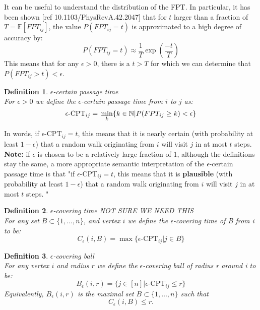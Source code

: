 \documentclass{article}
\newtheorem{definition}{Definition}
\begin{document}
It can be useful to understand the distribution of the FPT. In particular, it has been shown [ref 
10.1103/PhysRevA.42.2047] that for $t$ larger than a fraction of $T=\mathbb{E}[FPT_{ij}]$, the value $P(FPT_{ij}=t)$ is approximated to a high degree of accuracy by:
\begin{equation}
P(FPT_{ij}=t) \approx \frac{1}{T}\exp\left({\frac{-t}{T}}\right)
\end{equation}
This means that for any $\epsilon>0$, there is a $t>T$ for which we can determine that $P(FPT_{ij}>t)<\epsilon$.
\begin{definition}
    $\epsilon$-certain passage time \\
    For $\epsilon > 0$ we define the $\epsilon$-certain passage time from $i$ to $j$ as:
     \[
         \epsilon\text{-CPT}_{ij} =   \\\min_k \{k \in \mathbb{N} | P(FPT_{ij}\geq k)<\epsilon \}
     \]
\end{definition}

In words, if $\epsilon\text{-CPT}_{ij} = t$, this means that it is nearly certain (with probability at least $1-\epsilon$) that a random walk originating from $i$ will visit $j$ in at most $t$ steps. \\
\textbf{Note:} if $\epsilon$ is chosen to be a relatively large fraction of $1$, although the definitions stay the same, a more appropriate semantic interpretation of the $\epsilon$-certain passage time is that "if $\epsilon\text{-CPT}_{ij} = t$, this means that it is \textbf{plausible} (with probability at least $1-\epsilon$) that a random walk originating from $i$ will visit $j$ in at most $t$ steps. "


\begin{definition}
    $\epsilon$-covering time \textit{NOT SURE WE NEED THIS} \\
    For any set $B\subset \{1,\dots, n\}$, and vertex $i$ we define the \textit{$\epsilon$-covering time of B from i} to be:
    \[
        C_{\epsilon}(i, B) = \max\{\epsilon\text{-CPT}_{ij} | j\in B \}
    \] 
\end{definition}

\begin{definition}
    $\epsilon$-covering ball \\
    For any vertex $i$ and radius $r$ we define the \textit{$\epsilon$-covering ball of radius r around i} to be:
\[
    B_{\epsilon}(i,r) = \{j\in [n] | \epsilon\text{-CPT}_{ij}\leq r \}
\] 
Equivalently, $B_{\epsilon}(i,r)$ is the maximal set $B\subset \{1,\dots, n\}$ such that 
\[
    C_{\epsilon}(i, B) \leq r
.\] 
    
\end{definition}
\end{document}
